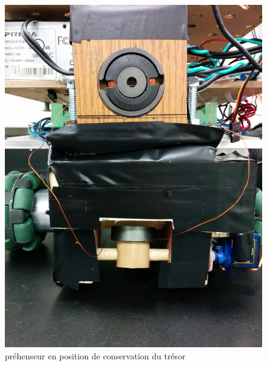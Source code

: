 \begin{figure}[ht]
  \centering
  \includegraphics[scale=0.05]{resources/prehenseur_up.jpg}
  \caption{préhenseur en position de conservation du trésor}
  \label{fig:lift_up}
\end{figure}
